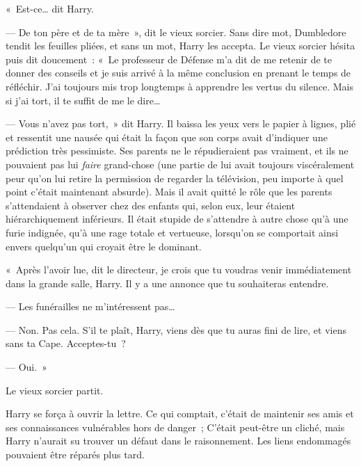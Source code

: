 «~Est-ce… dit Harry.

--- De ton père et de ta mère~», dit le vieux sorcier. Sans dire mot, Dumbledore tendit les feuilles pliées, et sans un mot, Harry les accepta. Le vieux sorcier hésita puis dit doucement~: «~Le professeur de Défense m'a dit de me retenir de te donner des conseils et je suis arrivé à la même conclusion en prenant le temps de réfléchir. J'ai toujours mis trop longtemps à apprendre les vertus du silence. Mais si j'ai tort, il te suffit de me le dire…

--- Vous n'avez pas tort,~» dit Harry. Il baissa les yeux vers le papier à lignes, plié et ressentit une nausée qui était la façon que son corps avait d'indiquer une prédiction très pessimiste. Ses parents ne le répudieraient pas vraiment, et ils ne pouvaient pas lui \emph{faire} grand-chose (une partie de lui avait toujours viscéralement peur qu'on lui retire la permission de regarder la télévision, peu importe à quel point c'était maintenant absurde). Mais il avait quitté le rôle que les parents s'attendaient à observer chez des enfants qui, selon eux, leur étaient hiérarchiquement inférieurs. Il était stupide de s'attendre à autre chose qu'à une furie indignée, qu'à une rage totale et vertueuse, lorsqu'on se comportait ainsi envers quelqu'un qui croyait être le dominant.

«~Après l'avoir lue, dit le directeur, je crois que tu voudras venir immédiatement dans la grande salle, Harry. Il y a une annonce que tu souhaiteras entendre.

--- Les funérailles ne m'intéressent pas…

--- Non. Pas cela. S'il te plaît, Harry, viens dès que tu auras fini de lire, et viens sans ta Cape. Acceptes-tu~?

--- Oui.~»

Le vieux sorcier partit.

Harry se força à ouvrir la lettre. Ce qui comptait, c'était de maintenir ses amis et ses connaissances vulnérables hors de danger~; C'était peut-être un cliché, mais Harry n'aurait su trouver un défaut dans le raisonnement. Les liens endommagés pouvaient être réparés plus tard.

